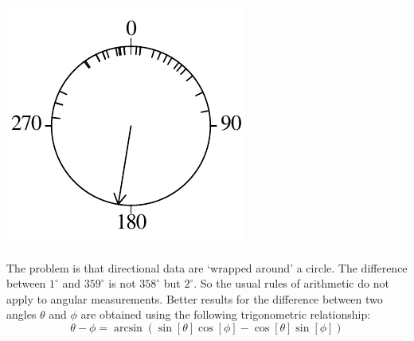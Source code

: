 \noindent\begin{minipage}[t][][b]{.2\textwidth}
\includegraphics[width=\textwidth]{../figures/circle2.pdf}\\
\end{minipage}
\begin{minipage}[t][][t]{.8\textwidth}
  \label{fig:circle2}
\end{minipage}

The problem is that directional data are `wrapped around' a circle.
The difference between $1^{\circ}$ and $359^{\circ}$ is not
$358^{\circ}$ but $2^{\circ}$. So the usual rules of arithmetic do not
apply to angular measurements. Better results for the difference
between two angles $\theta$ and $\phi$ are obtained using the
following trigonometric relationship:
\begin{equation}
  \theta - \phi = \arcsin\left( \sin[\theta] \cos[\phi] -
                                \cos[\theta] \sin[\phi] \right)
  \label{eq:anglediff}
\end{equation}

